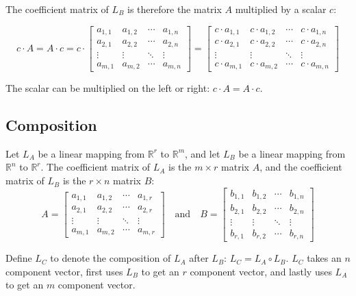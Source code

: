 \documentclass{article}
\begin{document}
The coefficient matrix of \(L_B\) is therefore the matrix \(A\) multiplied by a scalar \(c\): 

\[c \cdot A = A \cdot c = c \cdot \begin{bmatrix} 
a_{1,1} & a_{1,2} & \cdots & a_{1,n} \\
a_{2,1} & a_{2,2} & \cdots & a_{2,n} \\
\vdots & \vdots & \ddots & \vdots \\
a_{m,1} & a_{m,2} & \cdots & a_{m,n} 
\end{bmatrix} = \begin{bmatrix} 
c \cdot a_{1,1} & c \cdot a_{1,2} & \cdots & c \cdot a_{1,n} \\
c \cdot a_{2,1} & c \cdot a_{2,2} & \cdots & c \cdot a_{2,n} \\
\vdots & \vdots & \ddots & \vdots \\
c \cdot a_{m,1} & c \cdot a_{m,2} & \cdots & c \cdot a_{m,n} 
\end{bmatrix}\]

The scalar can be multiplied on the left or right: \(c \cdot A = A \cdot c\).




\subsection*{Composition}

Let \(L_A\) be a linear mapping from \(\mathbb{R}^r\) to \(\mathbb{R}^m\), and let \(L_B\) be a linear mapping from \(\mathbb{R}^n\) to \(\mathbb{R}^r\). The coefficient matrix of \(L_A\) is the \(m \times r\) matrix \(A\), and the coefficient matrix of \(L_B\) is the \(r \times n\) matrix \(B\):
\[A = \begin{bmatrix} 
a_{1,1} & a_{1,2} & \cdots & a_{1,r} \\
a_{2,1} & a_{2,2} & \cdots & a_{2,r} \\
\vdots & \vdots & \ddots & \vdots \\
a_{m,1} & a_{m,2} & \cdots & a_{m,r} 
\end{bmatrix} \quad\text{and}\quad B = \begin{bmatrix} 
b_{1,1} & b_{1,2} & \cdots & b_{1,n} \\
b_{2,1} & b_{2,2} & \cdots & b_{2,n} \\
\vdots & \vdots & \ddots & \vdots \\
b_{r,1} & b_{r,2} & \cdots & b_{r,n} 
\end{bmatrix}\]

Define \(L_C\) to denote the composition of \(L_A\) after \(L_B\): \(L_C = L_A \circ L_B\). \(L_C\) takes an \(n\) component vector, first uses \(L_B\) to get an \(r\) component vector, and lastly uses \(L_A\) to get an \(m\) component vector.
\end{document}

